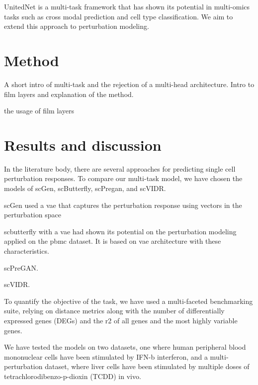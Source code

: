 \documentclass[12pt, a4paper]{article}
\begin{document}


UnitedNet is a multi-task framework that has shown its potential in multi-omics tasks such as cross modal prediction and cell type classification. We aim to extend this approach to perturbation modeling.


\section{Method}

A short intro of multi-task and the rejection of a multi-head architecture. Intro to film layers and explanation of the method.

the usage of film layers

\section{Results and discussion}

In the literature body, there are several approaches for predicting single cell perturbation responses. To compare our multi-task model, we have chosen the models of scGen, scButterfly, scPregan, and scVIDR.


scGen used a vae that captures the perturbation response using vectors in the perturbation space

scbutterfly with a vae had shown its potential on the perturbation modeling applied on the pbmc dataset. It is based on vae architecture with these characteristics.

scPreGAN.

scVIDR.

To quantify the objective of the task, we have used a multi-faceted benchmarking suite, relying on distance metrics along with the number of differentially expressed genes (DEGs) and the r2 of all genes and the most highly variable genes.

We have tested the models on two datasets, one where human peripheral blood mononuclear cells have been stimulated by IFN-b interferon, and a multi-perturbation dataset, where liver cells have been stimulated by multiple doses of tetrachlorodibenzo-p-dioxin (TCDD) in vivo.
\end{document}
